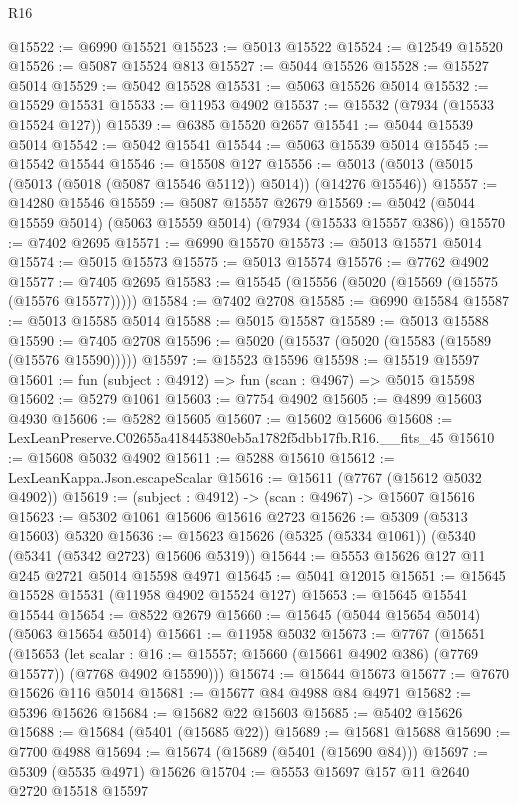 \begin{lexlean}{R16}
\begin{coremodule}
@15522 := @6990 @15521
@15523 := @5013 @15522
@15524 := @12549 @15520
@15526 := @5087 @15524 @813
@15527 := @5044 @15526
@15528 := @15527 @5014
@15529 := @5042 @15528
@15531 := @5063 @15526 @5014
@15532 := @15529 @15531
@15533 := @11953 @4902
@15537 := @15532 (@7934 (@15533 @15524 @127))
@15539 := @6385 @15520 @2657
@15541 := @5044 @15539 @5014
@15542 := @5042 @15541
@15544 := @5063 @15539 @5014
@15545 := @15542 @15544
@15546 := @15508 @127
@15556 := @5013 (@5013 (@5015 (@5013 (@5018 (@5087 @15546 @5112)) @5014)) (@14276 @15546))
@15557 := @14280 @15546
@15559 := @5087 @15557 @2679
@15569 := @5042 (@5044 @15559 @5014) (@5063 @15559 @5014) (@7934 (@15533 @15557 @386))
@15570 := @7402 @2695
@15571 := @6990 @15570
@15573 := @5013 @15571 @5014
@15574 := @5015 @15573
@15575 := @5013 @15574
@15576 := @7762 @4902
@15577 := @7405 @2695
@15583 := @15545 (@15556 (@5020 (@15569 (@15575 (@15576 @15577)))))
@15584 := @7402 @2708
@15585 := @6990 @15584
@15587 := @5013 @15585 @5014
@15588 := @5015 @15587
@15589 := @5013 @15588
@15590 := @7405 @2708
@15596 := @5020 (@15537 (@5020 (@15583 (@15589 (@15576 @15590)))))
@15597 := @15523 @15596
@15598 := @15519 @15597
@15601 := fun (subject : @4912) => fun (scan : @4967) => @5015 @15598
@15602 := @5279 @1061
@15603 := @7754 @4902
@15605 := @4899 @15603 @4930
@15606 := @5282 @15605
@15607 := @15602 @15606
@15608 := LexLeanPreserve.C02655a418445380eb5a1782f5dbb17fb.R16.__fits_45
@15610 := @15608 @5032 @4902
@15611 := @5288 @15610
@15612 := LexLeanKappa.Json.escapeScalar
@15616 := @15611 (@7767 (@15612 @5032 @4902))
@15619 := (subject : @4912) -> (scan : @4967) -> @15607 @15616
@15623 := @5302 @1061 @15606 @15616 @2723
@15626 := @5309 (@5313 @15603) @5320
@15636 := @15623 @15626 (@5325 (@5334 @1061)) (@5340 (@5341 (@5342 @2723) @15606 @5319))
@15644 := @5553 @15626 @127 @11 @245 @2721 @5014 @15598 @4971
@15645 := @5041 @12015
@15651 := @15645 @15528 @15531 (@11958 @4902 @15524 @127)
@15653 := @15645 @15541 @15544
@15654 := @8522 @2679
@15660 := @15645 (@5044 @15654 @5014) (@5063 @15654 @5014)
@15661 := @11958 @5032
@15673 := @7767
    (@15651
      (@15653
        (let scalar : @16 := @15557; @15660 (@15661 @4902 @386) (@7769 @15577))
        (@7768 @4902 @15590)))
@15674 := @15644 @15673
@15677 := @7670 @15626 @116 @5014
@15681 := @15677 @84 @4988 @84 @4971
@15682 := @5396 @15626
@15684 := @15682 @22 @15603
@15685 := @5402 @15626
@15688 := @15684 (@5401 (@15685 @22))
@15689 := @15681 @15688
@15690 := @7700 @4988
@15694 := @15674 (@15689 (@5401 (@15690 @84)))
@15697 := @5309 (@5535 @4971) @15626
@15704 := @5553 @15697 @157 @11 @2640 @2720 @15518 @15597

\end{coremodule}
\end{lexlean}
